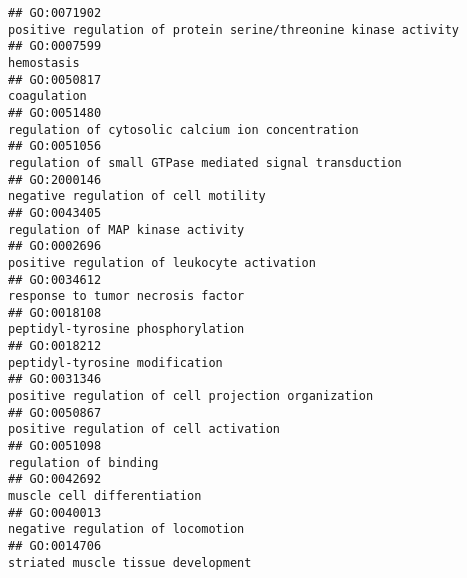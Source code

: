 \documentclass[
]{article}
\begin{document}
\begin{verbatim}
## GO:0071902                                                                                  positive regulation of protein serine/threonine kinase activity
## GO:0007599                                                                                                                                       hemostasis
## GO:0050817                                                                                                                                      coagulation
## GO:0051480                                                                                                regulation of cytosolic calcium ion concentration
## GO:0051056                                                                                          regulation of small GTPase mediated signal transduction
## GO:2000146                                                                                                             negative regulation of cell motility
## GO:0043405                                                                                                                regulation of MAP kinase activity
## GO:0002696                                                                                                      positive regulation of leukocyte activation
## GO:0034612                                                                                                                response to tumor necrosis factor
## GO:0018108                                                                                                                peptidyl-tyrosine phosphorylation
## GO:0018212                                                                                                                   peptidyl-tyrosine modification
## GO:0031346                                                                                              positive regulation of cell projection organization
## GO:0050867                                                                                                           positive regulation of cell activation
## GO:0051098                                                                                                                            regulation of binding
## GO:0042692                                                                                                                      muscle cell differentiation
## GO:0040013                                                                                                                negative regulation of locomotion
## GO:0014706                                                                                                               striated muscle tissue development

\end{verbatim}
\end{document}
